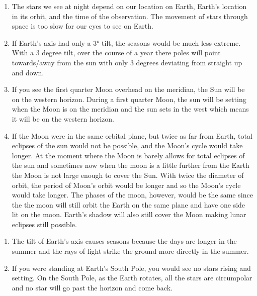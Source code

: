 \documentclass[../hw1.tex]{subfiles}
\begin{document}
    \begin{enumerate}
        \item{} The stars we see at night depend on our location on Earth, Earth’s location in its orbit, and the time of the observation. The movement of stars through space is too slow for our eyes to see on Earth.
        \item{} If Earth’s axis had only a \ang{3} tilt, the seasons would be much less extreme. With a 3 degree tilt, over the course of a year there poles will point towards/away from the sun with only 3 degrees deviating from straight up and down.
        \item If you see the first quarter Moon overhead on the meridian, the Sun will be on the western horizon. During a first quarter Moon, the sun will be setting when the Moon is on the meridian and the sun sets in the west which means it will be on the western horizon.
        \item{} If the Moon were in the same orbital plane, but twice as far from Earth, total eclipses of the sun would not be possible, and the Moon’s cycle would take longer. At the moment where the Moon is barely allows for total eclipses of the sun and sometimes now when the moon is a little further from the Earth the Moon is not large enough to cover the Sun. With twice the diameter of orbit, the period of Moon's orbit would be longer and so the Moon's cycle would take longer. The phases of the moon, however, would be the same since the the moon will still orbit the Earth on the same plane and have one side lit on the moon. Earth's shadow will also still cover the Moon making lunar eclipses still possible.
    \end{enumerate}
    \begin{enumerate}
        \item{} The tilt of Earth’s axis causes seasons because the days are longer in the summer and the rays of light strike the ground more directly in the summer.
        \item{} If you were standing at Earth’s South Pole, you would see no stars rising and setting. On the South Pole, as the Earth rotates, all the stars are circumpolar and no star will go past the horizon and come back. 
    \end{enumerate}
\end{document}
